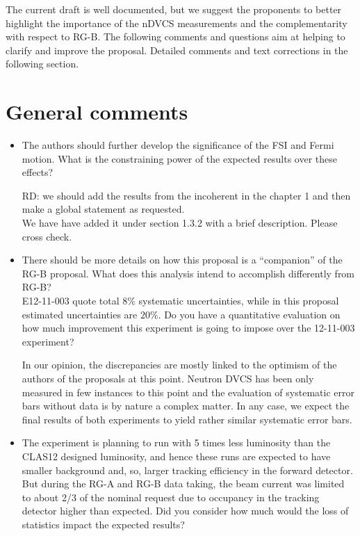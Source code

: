 The current draft is well documented, but we suggest the proponents to better 
highlight the importance of the nDVCS measurements and the complementarity with 
respect to RG-B.
The following comments and questions aim at helping to clarify and improve the 
proposal. Detailed comments and text corrections in the following section.
 
 
 \section*{General comments}
 
  \begin{itemize}
  
\item The authors should further develop the significance of the FSI and Fermi 
   motion. What is the constraining power of the expected results over these 
        effects?

{\color{red} RD: we should add the results from the incoherent in the chapter 1 
        and then make a global statement as requested.\\
        We have  have added it under section 1.3.2 with a brief description.  
        Please cross check.}

\item There should be more details  on how this  proposal is a ``companion'' of 
   the RG-B proposal. What does this analysis intend to accomplish differently 
        from RG-B?  \\ E12-11-003 quote total $8\%$ systematic uncertainties, 
        while in this proposal estimated uncertainties are $20\%$. Do you have 
        a quantitative evaluation on how much improvement this experiment is 
        going to impose over the 12-11-003 experiment?

 {\color{red} In our opinion, the discrepancies are mostly linked to the 
        optimism of the authors of the proposals at this point. Neutron DVCS 
        has been only measured in few instances to this point and the 
        evaluation of systematic error bars without data is by nature a complex 
        matter. In any case, we expect the final results of both experiments to 
        yield rather similar systematic error bars.}
 
 \item The experiment is planning to run with 5 times less luminosity than the 
    CLAS12 designed luminosity, and hence these runs are expected to have 
        smaller background and, so, larger tracking efficiency in the forward 
        detector. But during the RG-A and RG-B data taking, the beam current 
        was limited to about 2/3 of the nominal request due to occupancy in the 
        tracking detector higher than expected. Did you consider how much would 
        the loss of statistics impact the expected results? 
 

\end{itemize}
